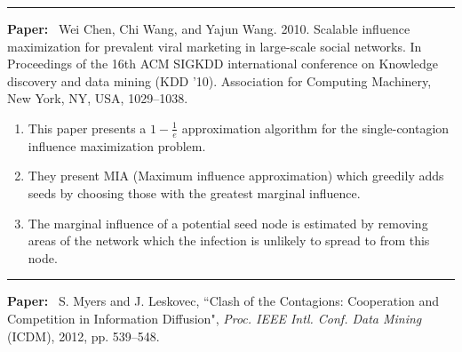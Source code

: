 \documentclass[11pt]{article}
\begin{document}
\noindent
\rule{\textwidth}{0.01in}
\clearpage
\textbf{Paper:}~ Wei Chen, Chi Wang, and Yajun Wang. 2010. Scalable influence maximization for prevalent viral marketing in large-scale social networks. In Proceedings of the 16th ACM SIGKDD international conference on Knowledge discovery and data mining (KDD ’10). Association for Computing Machinery, New York, NY, USA, 1029–1038. 
\begin{enumerate}
    \item This paper presents a $1 - \frac{1}{e}$ approximation algorithm for the single-contagion influence maximization problem.
    \item They present MIA (Maximum influence approximation) which greedily adds seeds by choosing those with the greatest marginal influence.
    \item The marginal influence of a potential seed node is estimated by removing areas of the network which the infection is unlikely to spread to from this node.
    
\end{enumerate}
  

\noindent
\rule{\textwidth}{0.01in}
\clearpage
\textbf{Paper:}~ 
S. Myers and J. Leskovec, ``Clash of the Contagions: Cooperation and
Competition in Information Diffusion", \emph{Proc. IEEE Intl. Conf. Data Mining}
(ICDM), 2012, pp. 539--548.
\end{document}
